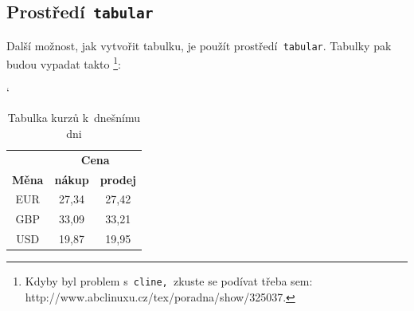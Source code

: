 \documentclass[11pt,a4paper,oneside]{article}
\begin{document}
	\cprotect\subsection{Prostředí\texttt{ tabular}} 	

	Další možnost, jak vytvořit tabulku, je použít prostředí\texttt{ tabular}. Tabulky pak budou vypadat takto \footnote{Kdyby byl problem s\texttt{ cline, }zkuste se podívat třeba sem: http://www.abclinuxu.cz/tex/poradna/show/325037.}:
	\medskip	
	
	\begin{table}[H]
	\centering
	\catcode`
		\begin{tabular}{|c|c|c|}
		\hline
		\multicolumn{1}{|c|}{\textbf{}} & \multicolumn{2}{c|}{\textbf{Cena}} \\ \cline{2-3} 
		\textbf{Měna} & \textbf{nákup} & \textbf{prodej} \\ \hline
			EUR & 27,34 & 27,42 \\
			GBP & 33,09 & 33,21 \\
			USD & 19,87 & 19,95 \\ \hline
		\end{tabular}
	\caption{Tabulka kurzů k~dnešnímu dni}
	\label{fig:tab1}
	\end{table}

	\bigskip
\end{document}
